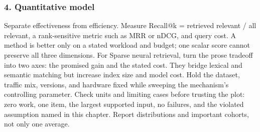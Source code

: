 \subsubsection*{4. Quantitative model}
Separate effectiveness from efficiency. Measure Recall@k = retrieved relevant / all relevant, a rank-sensitive metric such as MRR or nDCG, and query cost. A method is better only on a stated workload and budget; one scalar score cannot preserve all three dimensions.
For Sparse neural retrieval, turn the prose tradeoff into two axes: the promised gain and the stated cost. They bridge lexical and semantic matching but increase index size and model cost. Hold the dataset, traffic mix, versions, and hardware fixed while sweeping the mechanism's controlling parameter.
Check units and limiting cases before trusting the plot: zero work, one item, the largest supported input, no failures, and the violated assumption named in this chapter. Report distributions and important cohorts, not only one average.
